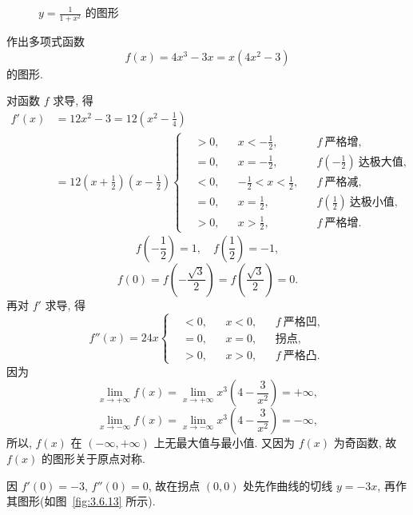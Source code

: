 \begin{figure}[htbp]
\centering
{}
\caption{$y=\frac{1}{1+x^2}$ 的图形}\label{fig:3.6.12}
\end{figure}

\begin{example}\label{ex:3.6.9}
作出多项式函数
\[
f(x)=4x^{3}-3x=x(4x^{2}-3)
\]
的图形.
\end{example}

\begin{solution}
对函数 $f$ 求导, 得
\begin{align*}
f'(x)&=12x^{2}-3=12\left(x^{2}-\frac{1}{4}\right)\\
&=12\left(x+\frac{1}{2}\right)\left(x-\frac{1}{2}\right)\left\{
\begin{aligned}
&>0, &&x<-\frac{1}{2}, &&f\ \text{严格增},\\
&=0, &&x=-\frac{1}{2}, &&f\left(-\frac{1}{2}\right)\ \text{达极大值},\\
&<0, &&-\frac{1}{2}<x<\frac{1}{2}, &&f\ \text{严格减},\\
&=0, &&x=\frac{1}{2}, &&f\left(\frac{1}{2}\right)\ \text{达极小值},\\
&>0, &&x>\frac{1}{2}, &&f\ \text{严格增}.
\end{aligned}\right.
\end{align*}
\[
f\left(-\frac{1}{2}\right)=1,\quad f\left(\frac{1}{2}\right)=-1,
\]
\[
f(0)=f\left(-\frac{\sqrt{3}}{2}\right)=f\left(\frac{\sqrt{3}}{2}\right)=0.
\]
再对 $f'$ 求导, 得
\[
f''(x)=24x\left\{
\begin{aligned}
&<0, &&x<0, &&f\ \text{严格凹},\\
&=0, &&x=0, &&\text{拐点},\\
&>0, &&x>0, &&f\ \text{严格凸}.
\end{aligned}\right.
\]
因为
\[
\lim_{x\to+\infty}f(x)=\lim_{x\to+\infty}x^{3}\left(4-\frac{3}{x^{2}}\right)=+\infty,
\]
\[
\lim_{x\to-\infty}f(x)=\lim_{x\to-\infty}x^{3}\left(4-\frac{3}{x^{2}}\right)=-\infty,
\]
所以, $f(x)$ 在 $(-\infty,+\infty)$ 上无最大值与最小值. 又因为 $f(x)$ 为奇函数, 故 $f(x)$ 的图形关于原点对称.

因 $f'(0)=-3$, $f''(0)=0$, 故在拐点 $(0,0)$ 处先作曲线的切线 $y=-3x$, 再作其图形(如图~\ref{fig:3.6.13} 所示).
\end{solution}

